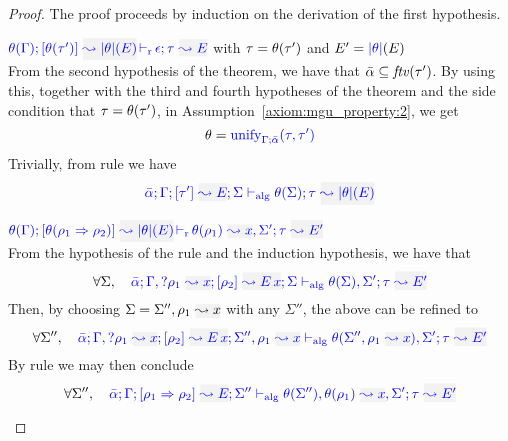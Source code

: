 \begin{proof}
The proof proceeds by induction on the derivation of the first hypothesis.
\begin{description}
\setlength{\itemsep}{1em}
\item[\fbox{\rref{M-Simp}}]\quad
$\dmres{\theta(\tenv)}{\theta(\type')}{\etrans{\theta}(E)}{\type}{E}{\epsilon}$ \quad with $\tau = \theta(\tau')$ and $E' = {\color{blue} |\theta|}(E)$ \\

From the second hypothesis of the theorem, we have that $\bar\alpha\subseteq{\it ftv }(\tau')$. By
using this, together with the third and fourth hypotheses of the theorem and the side condition
that $\tau = \theta(\tau')$, in Assumption~\ref{axiom:mgu_property:2}, we get
\begin{equation*}
  \theta = {\color{blue} \mathrm{unify}_{\Gamma;\bar{\alpha}}(\tau,\tau')}
\end{equation*}
Trivially, from rule  we have
\begin{equation*}
  \admres{\bar\alpha}{\tenv}{\type'}{E}{\Sigma}{\type}{\etrans{\theta}(E)}{\theta(\Sigma)}
\end{equation*}

\item[\fbox{\rref{M-IApp}}]\quad
$\dmres{\theta(\tenv)}{\theta(\rulet_1\To\rulet_2)}{\etrans{\theta}(E)}{\type}{E'}{\ie{\theta(\rulet_1)}{x},\Sigma'}$\ \\

  From the hypothesis of the rule and the induction hypothesis, we have that
\begin{equation*}
\forall\Sigma,\quad \admres{\bar\alpha}{\tenv,\envi{\rulet_1}{x}}{\rulet_2}{\mmapp{E}{x}}{\Sigma}{\type}{E'}{\theta(\Sigma),\Sigma'}
\end{equation*}
Then, by choosing $\Sigma = \Sigma'',\ie{\rulet_1}{x}$ with any $\Sigma''$, the above can be refined to
\begin{equation*}
\forall \Sigma'',\quad\admres{\bar\alpha}{\tenv,\envi{\rulet_1}{x}}{\rulet_2}{\mmapp{E}{x}}{\Sigma'',\ie{\rulet_1}{x}}{\type}{E'}{\theta(\Sigma'',\ie{\rulet_1}{x}),\Sigma'}
\end{equation*}
  By rule  we may then conclude
\begin{equation*}
\forall\Sigma'',\quad\admres{\bar\alpha}{\tenv}{\rulet_1\To\rulet_2}{E}{\Sigma''}{\type}{E'}{\theta(\Sigma''),\ie{\theta(\rulet_1)}{x},\Sigma'}
\end{equation*}


\end{description}
\end{proof}

